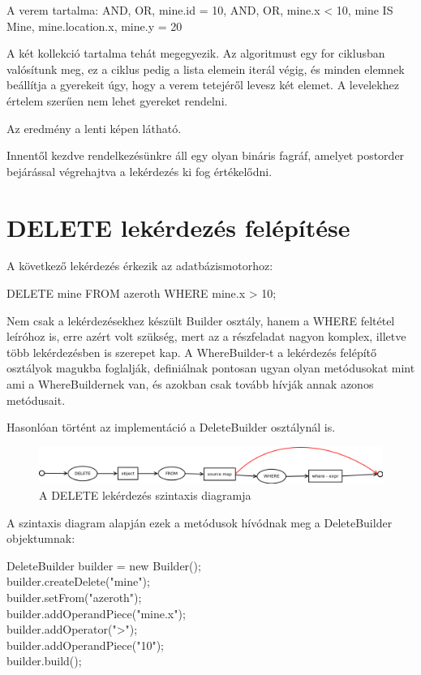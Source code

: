 A verem tartalma: AND, OR, mine.id = 10, AND, OR, mine.x < 10, mine IS Mine, mine.location.x, mine.y = 20

A két kollekció tartalma tehát megegyezik. Az algoritmust egy for ciklusban valósítunk meg, ez a ciklus pedig a lista elemein iterál végig, és minden elemnek beállítja a gyerekeit úgy, hogy a verem tetejéről levesz két elemet.
A levelekhez értelem szerűen nem lehet gyereket rendelni.

Az eredmény a lenti képen látható.

Innentől kezdve rendelkezésünkre áll egy olyan bináris fagráf, amelyet postorder bejárással végrehajtva a lekérdezés ki fog értékelődni.

\section{DELETE lekérdezés felépítése}

A következő lekérdezés érkezik az adatbázismotorhoz:
\begin{sql}
DELETE mine FROM azeroth WHERE mine.x > 10;
\end{sql}

Nem csak a lekérdezésekhez készült Builder osztály, hanem a WHERE feltétel leíróhoz is, erre azért volt szükség, mert az a részfeladat nagyon komplex, illetve több lekérdezésben is szerepet kap. A WhereBuilder-t a lekérdezés felépítő osztályok magukba foglalják, definiálnak pontosan ugyan olyan metódusokat mint ami a WhereBuildernek van, és azokban csak tovább hívják annak azonos metódusait.

Hasonlóan történt az implementáció a DeleteBuilder osztálynál is. 

\begin{figure}[htb]
	\begin{center}
		\includegraphics[scale=0.4]{images/delete}
		\caption{A DELETE lekérdezés szintaxis diagramja}
		\label{fig:deleteSytnax}
	\end{center}
\end{figure}

A szintaxis diagram alapján ezek a metódusok hívódnak meg a DeleteBuilder objektumnak:

DeleteBuilder builder = new Builder(); \\
builder.createDelete("mine"); \\ 
builder.setFrom("azeroth"); \\
builder.addOperandPiece("mine.x"); \\
builder.addOperator(">"); \\
builder.addOperandPiece("10"); \\
builder.build(); \\

